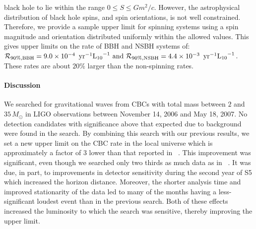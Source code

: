 black hole to lie within the range $0 \le S \le G m^{2}/c$.  However,
the astrophysical distribution of black hole spins, and spin
orientations, is not well constrained.  Therefore, we provide a sample
upper limit for spinning systems using a spin magnitude and orientation
distributed uniformly within the allowed values.  This gives upper
limits on the rate of BBH and NSBH systems of:
%
$\mathcal{R}_{90\%,{\rm BBH}} = 9.0 \times 10^{-4}\,
\textrm{ yr}^{-1}\mathrm{L_{10}}^{-1} \text{ and }
\mathcal{R}_{90\%,{\rm NSBH}} =  4.4 \times 10^{-3}\,
\textrm{ yr}^{-1}\mathrm{L_{10}}^{-1} \, .$
%
These rates are about $20\%$ larger than the non-spinning rates.

\paragraph{Discussion}

We searched for gravitational waves from CBCs with total mass between $2$ and
$35\, M_\odot$ in \ac{LIGO} observations between November 14, 2006 and May 18,
2007.  No detection candidates with significance above that expected due to
background were found in the search. By combining this search with our previous
results, we set a new upper limit on the CBC rate in the local universe which
is approximately a factor of $3$ lower than that reported in
~\cite{Collaboration:2009tt}.  This improvement was significant, even though we
searched only two thirds as much data as in ~\cite{Collaboration:2009tt}.  It
was due, in part, to improvements in detector sensitivity during the second
year of S5 which increased the horizon distance.  Moreover, the shorter
analysis time and improved stationarity of the data led to many of the months
having a less-significant loudest event than in the previous search.  Both of
these effects increased the luminosity to which the search was sensitive,
thereby improving the upper limit.

